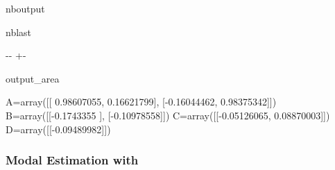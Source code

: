 \documentclass[letterpaper,10pt,english]{sphinxmanual}
\let\sphinxpxdimen\pdfpxdimen\else\newdimen\sphinxpxdimen
\begin{document}
\begin{sphinxuseclass}{nboutput}
\begin{sphinxuseclass}{nblast}
{

\kern-\sphinxverbatimsmallskipamount\kern-\baselineskip
\kern+\FrameHeightAdjust\kern-\fboxrule
\vspace{\nbsphinxcodecellspacing}

\begin{sphinxuseclass}{output_area}
\begin{sphinxuseclass}{}


\begin{sphinxVerbatim}[commandchars=\\\{\}]
A=array([[ 0.98607055,  0.16621799],
       [-0.16044462,  0.98375342]])
B=array([[-0.1743355 ],
       [-0.10978558]])
C=array([[-0.05126065,  0.08870003]])
D=array([[-0.09489982]])
\end{sphinxVerbatim}



\end{sphinxuseclass}
\end{sphinxuseclass}
}

\end{sphinxuseclass}
\end{sphinxuseclass}

\subsubsection{Modal Estimation with }
\label{\detokenize{examples/00_Overview:Modal-Estimation-with-mdof.modes()}}




\sphinxAtStartPar
\sphinxincludegraphics[width=550\sphinxpxdimen]{{modal}.png}
\end{document}
